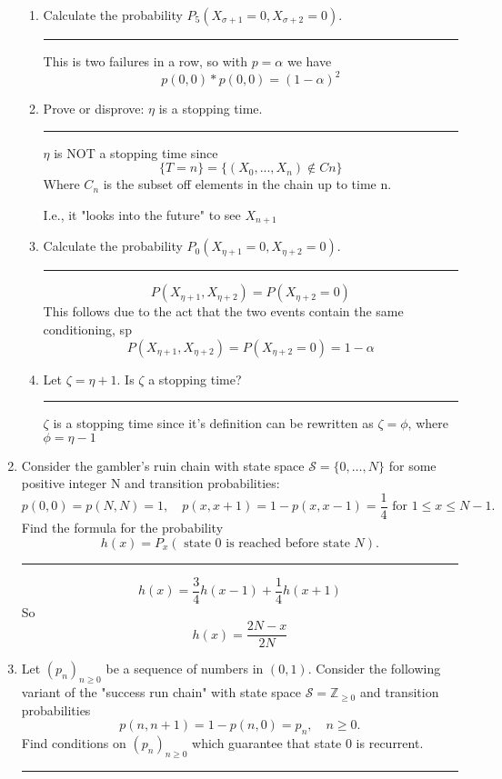 \documentclass{article} %
\theoremstyle{plain}
\theoremstyle{case}
\begin{document}
\begin{enumerate}[label={\fbox{\textbf{Exercise \#\arabic* :}}}]
\begin{enumerate}
	\item  Calculate the probability $P_5\left(X_{\sigma+1}=0, X_{\sigma+2}=0\right)$.
\par\noindent\rule{\textwidth}{0.1pt}
      This is two failures in a row, so with $p = \alpha$ we have
      \[ p(0,0) * p(0,0) = (1 - \alpha)^2 \]
	\item  Prove or disprove: $\eta$ is a stopping time.
\par\noindent\rule{\textwidth}{0.1pt}
      $\eta$ is NOT a stopping time since 
     \[ \{T = n\} = \{(X_0,...,X_n) \notin Cn \} \]
      Where $C_n$ is the subset off elements in the chain up to time n.

      I.e., it "looks into the future" to see $X_{n+1}$
	\item  Calculate the probability $P_0\left(X_{\eta+1}=0, X_{\eta+2}=0\right)$.
\par\noindent\rule{\textwidth}{0.1pt}
      \[ P(X_{\eta + 1},X_{\eta + 2}) = P(X_{\eta + 2}=0)  \]
      This follows due to the act that the two events contain the same
      conditioning, sp
      \[ P(X_{\eta + 1},X_{\eta + 2}) = P(X_{\eta + 2}=0) = 1 - \alpha \]
	\item  Let $\zeta=\eta+1$. Is $\zeta$ a stopping time?
\par\noindent\rule{\textwidth}{0.1pt}
      $\zeta$ is a stopping time since it's definition can be rewritten
      as $\zeta = \phi$, where $\phi = \eta - 1$
  \end{enumerate}

\newpage

  \item Consider the gambler's ruin chain with state space $\mathcal{S}=\{0, \ldots, N\}$ for some positive integer $\mathrm{N}$ and transition probabilities:
$$
p(0,0)=p(N, N)=1, \quad p(x, x+1)=1-p(x, x-1)=\frac{1}{4} \text { for } 1 \leq x \leq N-1 .
$$
Find the formula for the probability
$$
h(x)=P_x(\text { state } 0 \text { is reached before state } N) .
$$
\par\noindent\rule{\textwidth}{0.1pt}

  \[ h(x) = \frac{3}{4} h(x-1) + \frac{1}{4} h(x+1) \]
  So
  \[ h(x) = \frac{2N - x}{2N} \]

\newpage

  \item Let $\left(p_n\right)_{n \geq 0}$ be a sequence of numbers in $(0,1)$. Consider the following variant of the "success run chain" with state space $\mathcal{S}=\mathbb{Z}_{\geq 0}$ and transition probabilities
$$
p(n, n+1)=1-p(n, 0)=p_n, \quad n \geq 0 .
$$
Find conditions on $\left(p_n\right)_{n \geq 0}$ which guarantee that state 0 is recurrent.
\par\noindent\rule{\textwidth}{0.1pt}


\end{enumerate}
\end{document}
